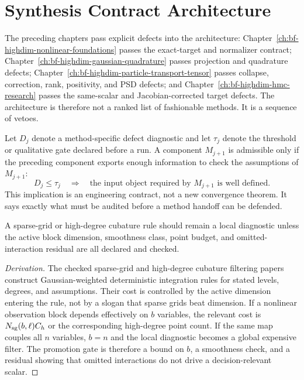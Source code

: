 \section{Synthesis Contract Architecture}
\label{sec:bf-hd-synthesis-architecture}

The preceding chapters pass explicit defects into the architecture:
Chapter~\ref{ch:bf-highdim-nonlinear-foundations} passes the exact-target and
normalizer contract; Chapter~\ref{ch:bf-highdim-gaussian-quadrature} passes
projection and quadrature defects;
Chapter~\ref{ch:bf-highdim-particle-transport-tensor} passes collapse,
correction, rank, positivity, and PSD defects; and
Chapter~\ref{ch:bf-highdim-hmc-research} passes the same-scalar and
Jacobian-corrected target defects.  The architecture is therefore not a ranked
list of fashionable methods.  It is a sequence of vetoes.

Let \(D_j\) denote a method-specific defect diagnostic and let
\(\tau_j\) denote the threshold or qualitative gate declared before a run.  A
component \(M_{j+1}\) is admissible only if the preceding component exports
enough information to check the assumptions of \(M_{j+1}\):
\[
  D_j\le \tau_j
  \quad\Longrightarrow\quad
  \text{the input object required by }M_{j+1}\text{ is well defined.}
  \label{eq:bf-hd-contract-handoff}
\]
This implication is an engineering contract, not a new convergence theorem.
It says exactly what must be audited before a method handoff can be defended.

\begin{proposition}
\label{prop:bf-hd-sparse-grid-promotion}
A sparse-grid or high-degree cubature rule should remain a local diagnostic
unless the active block dimension, smoothness class, point budget, and
omitted-interaction residual are all declared and checked.
\end{proposition}

\begin{proof}[Derivation]
The checked sparse-grid and high-degree cubature filtering papers construct
Gaussian-weighted deterministic integration rules for stated levels, degrees,
and assumptions.  Their cost is controlled by the active dimension entering the
rule, not by a slogan that sparse grids beat dimension.  If a nonlinear
observation block depends effectively on \(b\) variables, the relevant cost is
\(N_{\rm sg}(b,\ell)C_h\) or the corresponding high-degree point count.  If
the same map couples all \(n\) variables, \(b=n\) and the local diagnostic
becomes a global expensive filter.  The promotion gate is therefore a bound on
\(b\), a smoothness check, and a residual showing that omitted interactions do
not drive a decision-relevant scalar.
\end{proof}

